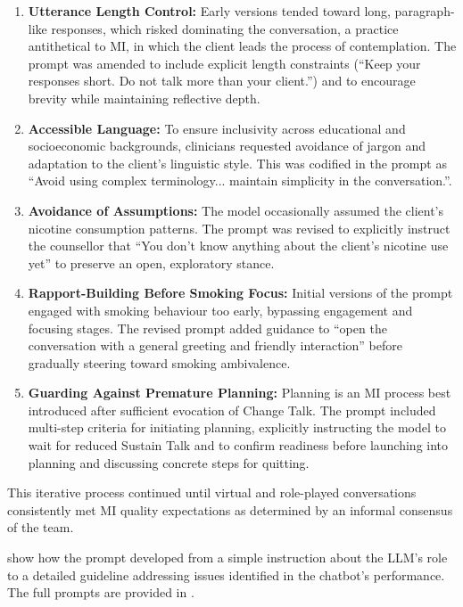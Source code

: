 \begin{enumerate}
	\item \textbf{Utterance Length Control:} Early versions tended toward long, paragraph-like responses, which risked dominating the conversation, a practice antithetical to MI, in which the client leads the process of contemplation. The prompt was amended to include explicit length constraints (``Keep your responses short. Do not talk more than your client.'') and to encourage brevity while maintaining reflective depth.

	\item \textbf{Accessible Language:} To ensure inclusivity across educational and socioeconomic backgrounds, clinicians requested avoidance of jargon and adaptation to the client's linguistic style. This was codified in the prompt as ``Avoid using complex terminology... maintain simplicity in the conversation.''.

	\item \textbf{Avoidance of Assumptions:} The model occasionally assumed the client's nicotine consumption patterns. The prompt was revised to explicitly instruct the counsellor that ``You don't know anything about the client's nicotine use yet'' to preserve an open, exploratory stance.

	\item \textbf{Rapport-Building Before Smoking Focus:} Initial versions of the prompt engaged with smoking behaviour too early, bypassing engagement and focusing stages. The revised prompt added guidance to ``open the conversation with a general greeting and friendly interaction'' before gradually steering toward smoking ambivalence.

	\item \textbf{Guarding Against Premature Planning:} Planning is an MI process best introduced after sufficient evocation of Change Talk. The prompt included multi-step criteria for initiating planning, explicitly instructing the model to wait for reduced Sustain Talk and to confirm readiness before launching into planning and discussing concrete steps for quitting.


\end{enumerate}



This iterative process continued until virtual and role-played conversations consistently met MI quality expectations as determined by an informal consensus of the team.


 show how the prompt developed from a simple instruction about the LLM's role to a detailed guideline addressing issues identified in the chatbot's performance. The full prompts are provided in .


